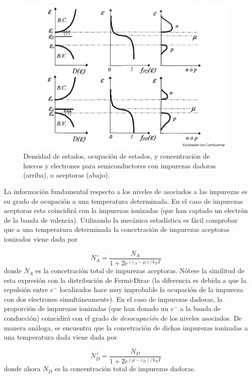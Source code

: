 \begin{figure}[h!] \centering
	\includegraphics[scale=0.35]{Cuerpo/Ch_09/Fotos libro 3.pdf}
	\caption{Densidad de estados, ocupación de estados, y concentración de huecos y electrones para semiconductores con impurezas dadoras (arriba), o aceptoras (abajo).}
	\label{Fig:09-03}
\end{figure}

La información fundamental respecto a los niveles de asociados a las impurezas es su grado de ocupación a una temperatura determinada. En el caso de impurezas aceptoras esta coincidirá con la impurezas ionizadas (que han captado un electrón de la banda de valencia). Utilizando la mecánica estadística es fácil comprobar que a una temperatura determinada la concetración de impurezas aceptoras ionizadas viene dada por

\begin{equation}
	N_A^- = \frac{N_A}{1+2e^{(\varepsilon_A-\mu)/k_BT}} \label{Ec:09-02-03}
\end{equation}
donde $N_A$ es la concetración total de impurezas aceptoras. Nótese la similitud de esta expresión con la distribución de Fermi-Dirac (la diferencia es debida a que la repulsión entre $e^-$ localizados hace muy improbable la ocupación de la impureza con dos electrones simultáneamente). En el caso de impurezas dadoras, la proporción de impurezas ionizadas (que han donado un $e^-$ a la banda de conducción) coincidirá con el grado de \textit{desocupación} de los niveles asociados. De manera análoga, se encuentra que la concetración de dichas impurezas ionizadas a una temperatura dada viene dada por
 
\begin{equation}
	N_D^+ =  \frac{N_D}{1+2e^{(\mu-\varepsilon_D)/k_BT}} \label{Ec:09-02-04}
\end{equation}
donde ahora $N_D$ es la concentración total de impurezas dadoras.

